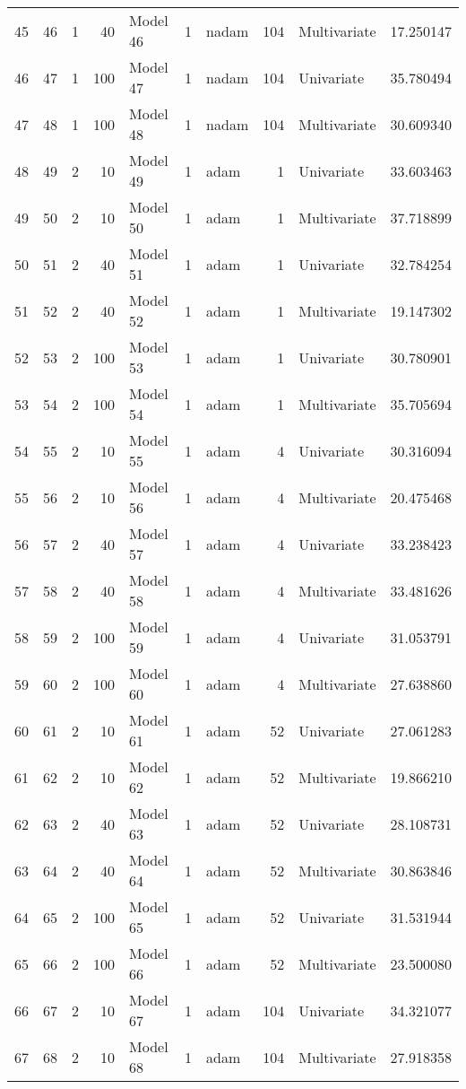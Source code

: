 \begin{tabular}{lrrrlrlrlr}
45 & 46 & 1 & 40 & Model 46 & 1 & nadam & 104 & Multivariate & 17.250147 \\
46 & 47 & 1 & 100 & Model 47 & 1 & nadam & 104 & Univariate & 35.780494 \\
47 & 48 & 1 & 100 & Model 48 & 1 & nadam & 104 & Multivariate & 30.609340 \\
48 & 49 & 2 & 10 & Model 49 & 1 & adam & 1 & Univariate & 33.603463 \\
49 & 50 & 2 & 10 & Model 50 & 1 & adam & 1 & Multivariate & 37.718899 \\
50 & 51 & 2 & 40 & Model 51 & 1 & adam & 1 & Univariate & 32.784254 \\
51 & 52 & 2 & 40 & Model 52 & 1 & adam & 1 & Multivariate & 19.147302 \\
52 & 53 & 2 & 100 & Model 53 & 1 & adam & 1 & Univariate & 30.780901 \\
53 & 54 & 2 & 100 & Model 54 & 1 & adam & 1 & Multivariate & 35.705694 \\
54 & 55 & 2 & 10 & Model 55 & 1 & adam & 4 & Univariate & 30.316094 \\
55 & 56 & 2 & 10 & Model 56 & 1 & adam & 4 & Multivariate & 20.475468 \\
56 & 57 & 2 & 40 & Model 57 & 1 & adam & 4 & Univariate & 33.238423 \\
57 & 58 & 2 & 40 & Model 58 & 1 & adam & 4 & Multivariate & 33.481626 \\
58 & 59 & 2 & 100 & Model 59 & 1 & adam & 4 & Univariate & 31.053791 \\
59 & 60 & 2 & 100 & Model 60 & 1 & adam & 4 & Multivariate & 27.638860 \\
60 & 61 & 2 & 10 & Model 61 & 1 & adam & 52 & Univariate & 27.061283 \\
61 & 62 & 2 & 10 & Model 62 & 1 & adam & 52 & Multivariate & 19.866210 \\
62 & 63 & 2 & 40 & Model 63 & 1 & adam & 52 & Univariate & 28.108731 \\
63 & 64 & 2 & 40 & Model 64 & 1 & adam & 52 & Multivariate & 30.863846 \\
64 & 65 & 2 & 100 & Model 65 & 1 & adam & 52 & Univariate & 31.531944 \\
65 & 66 & 2 & 100 & Model 66 & 1 & adam & 52 & Multivariate & 23.500080 \\
66 & 67 & 2 & 10 & Model 67 & 1 & adam & 104 & Univariate & 34.321077 \\
67 & 68 & 2 & 10 & Model 68 & 1 & adam & 104 & Multivariate & 27.918358 \\

\end{tabular}

